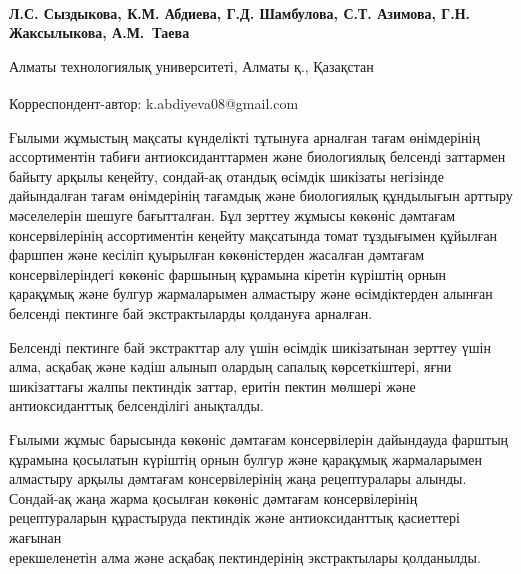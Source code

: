
\begin{articleheader}

{\bfseries
Л.С. Сыздыкова,
К.М. Абдиева\textsuperscript{\envelope },
Г.Д. Шамбулова,
С.Т. Азимова,
Г.Н. Жаксылыкова,
А.М.~Таева
}
\end{articleheader}

\begin{affiliation}
Алматы технологиялық университеті, Алматы қ., Қазақстан

\raggedright \textsuperscript{\envelope }Корреспондент-автор: k.abdiyeva08@gmail.com
\end{affiliation}

Ғылыми жұмыстың мақсаты күнделікті тұтынуға арналған тағам өнімдерінің
ассортиментін табиғи антиоксиданттармен және биологиялық белсенді
заттармен байыту арқылы кеңейту, сондай-ақ отандық өсімдік шикізаты
негізінде дайындалған тағам өнімдерінің тағамдық және биологиялық
құндылығын арттыру мәселелерін шешуге бағытталған. Бұл зерттеу жұмысы
көкөніс дәмтағам консервілерінің ассортиментін кеңейту мақсатында томат
тұздығымен құйылған фаршпен және кесіліп қуырылған көкөністерден
жасалған дәмтағам консервілеріндегі көкөніс фаршының құрамына кіретін
күріштің орнын қарақұмық және булгур жармаларымен алмастыру және
өсімдіктерден алынған белсенді пектинге бай экстрактыларды қолдануға
арналған.

Белсенді пектинге бай экстракттар алу үшін өсімдік шикізатынан зерттеу
үшін алма, асқабақ және кәдіш алынып олардың сапалық көрсеткіштері, яғни
шикізаттағы жалпы пектиндік заттар, еритін пектин мөлшері және
антиоксиданттық белсенділігі анықталды.

Ғылыми жұмыс барысында көкөніс дәмтағам консервілерін дайындауда фарштың
құрамына қосылатын күріштің орнын булгур және қарақұмық жармаларымен
алмастыру арқылы дәмтағам консервілерінің жаңа рецептуралары алынды.
Сондай-ақ жаңа жарма қосылған көкөніс дәмтағам консервілерінің
рецептураларын құрастыруда пектиндік және антиоксиданттық қасиеттері
жағынан \\ерекшеленетін алма және асқабақ пектиндерінің экстрактылары
қолданылды.

